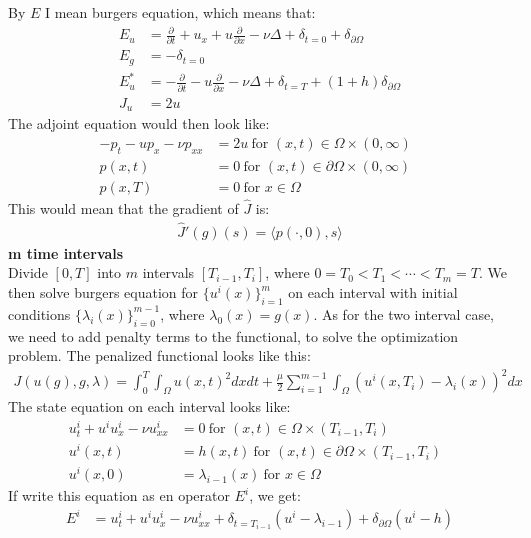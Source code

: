 \documentclass[11pt,a4paper]{report}
\begin{document}
By $E$ I mean burgers equation, which means that:
\begin{align*}
E_u &= \frac{\partial}{\partial t} + u_x + u\frac{\partial}{\partial x} - \nu\Delta + \delta_{t=0} + \delta_{\partial \Omega} \\
E_g &= -\delta_{t=0} \\
E_u^* &= -\frac{\partial}{\partial t}  -u\frac{\partial}{\partial x}- \nu\Delta + \delta_{t=T} + (1+h)\delta_{\partial \Omega} \\
J_u &= 2u
\end{align*}
The adjoint equation would then look like:
\begin{align*}
-p_t -up_x - \nu p_{xx} &= 2u \ \text{for $(x,t)\in \Omega\times(0,\infty)$}\\
p(x,t) &= 0 \ \text{for $(x,t) \in\partial\Omega\times(0,\infty)$ } \\
p(x,T) &= 0 \ \text{for $x \in\Omega$ }
\end{align*}
This would mean that the gradient of $\hat{J}$ is:
\begin{align*}
\hat{J}'(g)(s) = \langle p(\cdot,0), s\rangle
\end{align*}
\textbf{m time intervals}
\\
Divide $[0,T]$ into $m$ intervals $[T_{i-1},T_i]$, where $0=T_0<T_1<\cdots<T_m=T$. We then solve burgers equation for $\{u^i(x)\}_{i=1}^m$ on each interval with initial conditions $\{\lambda_i(x)\}_{i=0}^{m-1}$, where $\lambda_0(x)=g(x)$. As for the two interval case, we need to add penalty terms to the functional, to solve the optimization problem. The penalized functional looks like this:
\begin{align*}
J(u(g),g,\lambda) = \int_0^T\int_{\Omega} u(x,t)^2 dxdt + \frac{\mu}{2}\sum_{i=1}^{m-1}\int_{\Omega} (u^i(x,T_i)-\lambda_i(x))^2dx
\end{align*}
The state equation on each interval looks like:
\begin{align*}
u_t^i + u^iu_x^i - \nu u_{xx}^i &= 0 \ \text{for $(x,t)\in \Omega\times(T_{i-1},T_i)$}\\
u^i(x,t) &= h(x,t) \ \text{for $(x,t) \in\partial\Omega\times(T_{i-1},T_i)$ } \\
u^i(x,0) &= \lambda_{i-1}(x) \ \text{for $x \in\Omega$ }
\end{align*} 
If write this equation as en operator $E^i$, we get:
\begin{align*}
E^i &= u_t^i + u^iu_x^i - \nu u_{xx}^i +\delta_{t=T_{i-1}}(u^i-\lambda_{i-1}) + \delta_{\partial \Omega}(u^i-h)
\end{align*}
\end{document}
